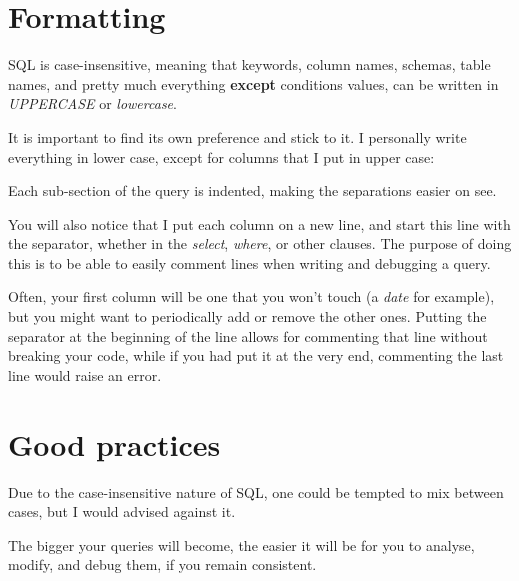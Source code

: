 \documentclass[12pt, letterpaper]{report}
\begin{document}
\section{Formatting}

SQL is case-insensitive, meaning that keywords, column names, schemas, table names, and pretty much everything \textbf{except} conditions values, can be written in \textit{UPPERCASE} or \textit{lowercase}.

It is important to find its own preference and stick to it. I personally write everything in lower case, except for columns that I put in upper case:


Each sub-section of the query is indented, making the separations easier on see.

You will also notice that I put each column on a new line, and start this line with the separator, whether in the \textit{select}, \textit{where}, or other clauses.
The purpose of doing this is to be able to easily comment lines when writing and debugging a query.

Often, your first column will be one that you won't touch (a \textit{date} for example), but you might want to periodically add or remove the other ones.
Putting the separator at the beginning of the line allows for commenting that line without breaking your code, while if you had put it at the very end, commenting the last line would raise an error.

\section{Good practices}

Due to the case-insensitive nature of SQL, one could be tempted to mix between cases, but I would advised against it.

The bigger your queries will become, the easier it will be for you to analyse, modify, and debug them, if you remain consistent.
\end{document}
